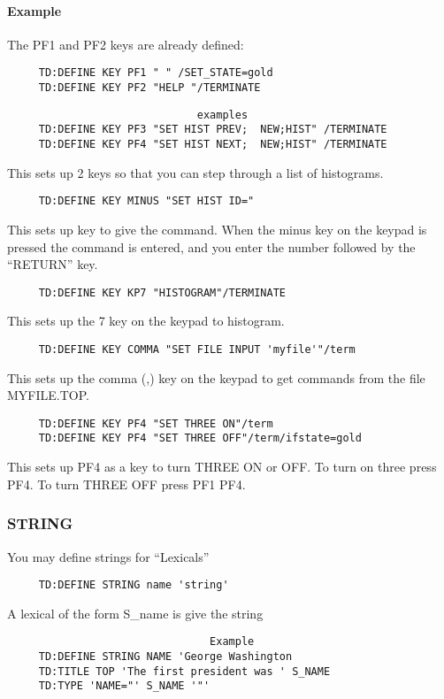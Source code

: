 \paragraph{Example}
The PF1 and PF2 keys are already defined:  
\begin{verbatim}
     TD:DEFINE KEY PF1 " " /SET_STATE=gold 
     TD:DEFINE KEY PF2 "HELP "/TERMINATE 
\end{verbatim}

\begin{verbatim}
                              examples
     TD:DEFINE KEY PF3 "SET HIST PREV;  NEW;HIST" /TERMINATE 
     TD:DEFINE KEY PF4 "SET HIST NEXT;  NEW;HIST" /TERMINATE 
\end{verbatim}
This  sets  up  2  keys  so  that  you  can  step  through  a list of
histograms.  

\begin{verbatim}
     TD:DEFINE KEY MINUS "SET HIST ID=" 
\end{verbatim}
This  sets  up  key  to  give the command.  When the minus key on the
keypad is pressed the command is entered, and you  enter  the  number
followed by the ``RETURN'' key.  

\begin{verbatim}
     TD:DEFINE KEY KP7 "HISTOGRAM"/TERMINATE 
\end{verbatim}
This sets up the 7 key on the keypad to histogram.  

\begin{verbatim}
     TD:DEFINE KEY COMMA "SET FILE INPUT 'myfile'"/term 
\end{verbatim}
This sets up the comma (,) key on the keypad to get commands from the
file MYFILE.TOP.  

\begin{verbatim}
     TD:DEFINE KEY PF4 "SET THREE ON"/term 
     TD:DEFINE KEY PF4 "SET THREE OFF"/term/ifstate=gold 
\end{verbatim}
This  sets up PF4 as a key to turn THREE ON or OFF.  To turn on three
press PF4.  To turn THREE OFF press PF1 PF4.  
\subsubsection{STRING}
You may define strings for ``Lexicals'' 
\begin{verbatim}
     TD:DEFINE STRING name 'string' 
\end{verbatim}
A lexical of the form S\_name is give the string 

\begin{verbatim}
                                Example
     TD:DEFINE STRING NAME 'George Washington 
     TD:TITLE TOP 'The first president was ' S_NAME 
     TD:TYPE 'NAME="' S_NAME '"' 
\end{verbatim}

